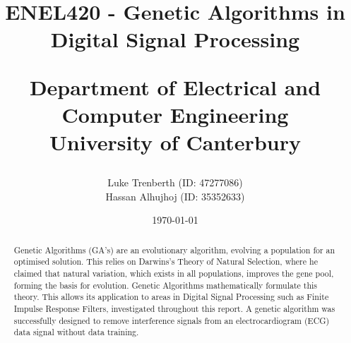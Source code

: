 \documentclass[a4paper, 11pt]{article}
\title{
    ENEL420 - Genetic Algorithms in Digital Signal Processing\\
    \vspace{2cm}
    \begin{large} 
        Department of Electrical and Computer Engineering\\
        University of Canterbury\\
    \end{large}
    \vspace{2cm}
}
\author{
    \small {Luke Trenberth (ID: 47277086)}\\
    \small {Hassan Alhujhoj (ID: 35352633)}\\
    }
\date{\small\today}
\begin{document}
\maketitle

\vspace{2cm}
\begin{abstract}
    Genetic Algorithms (GA's) are an evolutionary algorithm, evolving a population for an optimised 
    solution. This relies on Darwins's Theory of Natural Selection, where he claimed that natural variation, which exists in
    all populations, improves the gene pool, forming the basis for evolution. Genetic Algorithms mathematically 
    formulate this theory. This allows its application to areas in Digital Signal Processing such as 
    Finite Impulse Response Filters, investigated throughout this report. A genetic algorithm was successfully designed to remove
    interference signals from an electrocardiogram (ECG) data signal without data training.
    
\end{abstract}

\pagebreak
{}
\tableofcontents
{}
\pagebreak
\end{document}
